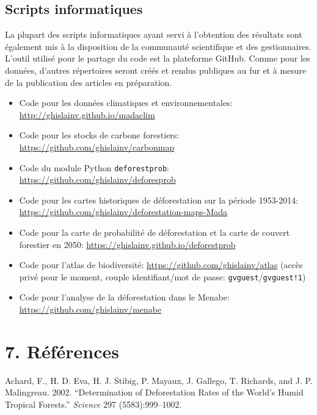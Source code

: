 \documentclass[12pt,]{article}
\providecommand{\tightlist}{%
  \setlength{\itemsep}{0pt}\setlength{\parskip}{0pt}}
\begin{document}
\hypertarget{scripts-informatiques}{%
\subsection{Scripts informatiques}\label{scripts-informatiques}}

La plupart des scripts informatiques ayant servi à l'obtention des
résultats sont également mis à la disposition de la communauté
scientifique et des gestionnaires. L'outil utilisé pour le partage du
code est la plateforme GitHub. Comme pour les données, d'autres
répertoires seront créés et rendus publiques au fur et à mesure de la
publication des articles en préparation.

\begin{itemize}
\tightlist
\item
  Code pour les données climatiques et environnementales:
  \url{http://ghislainv.github.io/madaclim}
\item
  Code pour les stocks de carbone forestiers:
  \url{https://github.com/ghislainv/carbonmap}
\item
  Code du module Python \texttt{deforestprob}:
  \url{https://github.com/ghislainv/deforesprob}
\item
  Code pour les cartes historiques de déforestation sur la période
  1953-2014: \url{https://github.com/ghislainv/deforestation-maps-Mada}
\item
  Code pour la carte de probabilité de déforestation et la carte de
  couvert forestier en 2050:
  \url{https://ghislainv.github.io/deforestprob}
\item
  Code pour l'atlas de biodiversité:
  \url{https://github.com/ghislainv/atlas} (accès privé pour le moment,
  couple identifiant/mot de passe: \texttt{gvguest}/\texttt{gvguest!1})
\item
  Code pour l'analyse de la déforestation dans le Menabe:
  \url{https://github.com/ghislainv/menabe}
\end{itemize}

\hypertarget{references}{%
\section{7. Références}\label{references}}

\hypertarget{refs}{}
\leavevmode\hypertarget{ref-Achard2002}{}%
Achard, F., H. D. Eva, H. J. Stibig, P. Mayaux, J. Gallego, T. Richards,
and J. P. Malingreau. 2002. ``Determination of Deforestation Rates of
the World's Humid Tropical Forests.'' \emph{Science} 297
(5583):999--1002.
\end{document}
